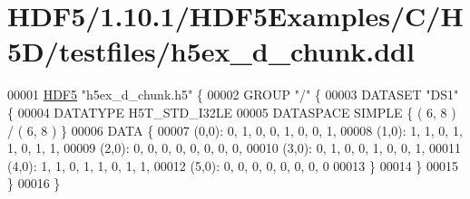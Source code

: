 \hypertarget{_h_d_f5_21_810_81_2_h_d_f5_examples_2_c_2_h5_d_2testfiles_2h5ex__d__chunk_8ddl_source}{}\section{H\+D\+F5/1.10.1/\+H\+D\+F5\+Examples/\+C/\+H5\+D/testfiles/h5ex\+\_\+d\+\_\+chunk.ddl}
\label{_h_d_f5_21_810_81_2_h_d_f5_examples_2_c_2_h5_d_2testfiles_2h5ex__d__chunk_8ddl_source}

\begin{DoxyCode}
00001 \hyperlink{namespace_h_d_f5}{HDF5} \textcolor{stringliteral}{"h5ex\_d\_chunk.h5"} \{
00002 GROUP \textcolor{stringliteral}{"/"} \{
00003    DATASET \textcolor{stringliteral}{"DS1"} \{
00004       DATATYPE  H5T\_STD\_I32LE
00005       DATASPACE  SIMPLE \{ ( 6, 8 ) / ( 6, 8 ) \}
00006       DATA \{
00007       (0,0): 0, 1, 0, 0, 1, 0, 0, 1,
00008       (1,0): 1, 1, 0, 1, 1, 0, 1, 1,
00009       (2,0): 0, 0, 0, 0, 0, 0, 0, 0,
00010       (3,0): 0, 1, 0, 0, 1, 0, 0, 1,
00011       (4,0): 1, 1, 0, 1, 1, 0, 1, 1,
00012       (5,0): 0, 0, 0, 0, 0, 0, 0, 0
00013       \}
00014    \}
00015 \}
00016 \}
\end{DoxyCode}
